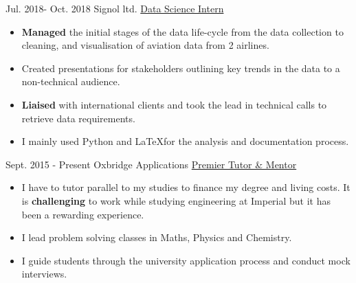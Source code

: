 \documentclass[letterpaper]{twentysecondcv} %
\begin{document}
\begin{twenty}
    \twentyitem
        {Jul. 2018-}
        {Oct. 2018}
        {Signol ltd.}
        {\href{http://www.signol.io}{Data Science Intern}}
        {}
        {\begin{itemize}
            \item \textbf{Managed} the initial stages of the data life-cycle from the data collection to cleaning, and visualisation of aviation data from 2 airlines. 
            \item Created presentations for stakeholders outlining key trends in the data to a non-technical audience. 
            \item \textbf{Liaised} with international clients and took the lead in technical calls to retrieve data requirements.  
            \item I mainly used Python and \LaTeX \space for the analysis and documentation process. 
        \end{itemize}}
\end{twenty}

\begin{twenty}
    \twentyitem
        {Sept. 2015 - }
        {Present}
        {Oxbridge Applications}
        {\href{http://www.oxbridgeapplications.com}{Premier Tutor \& Mentor}}
        {}
        {\begin{itemize}
            \item I have to tutor parallel to my studies to finance my degree and living costs. It is \textbf{challenging} to work while studying engineering at Imperial but it has been a rewarding experience. 
            \item I lead problem solving classes in Maths, Physics and Chemistry.
            \item I guide students through the university application process and conduct mock interviews. 
        \end{itemize}}
\end{twenty}


\end{document}
